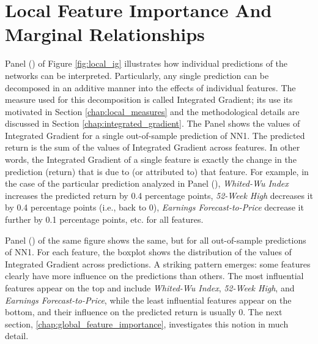 \section {Local Feature Importance And Marginal Relationships}
	\label{chap:local_feature_importance}

	Panel () of Figure \ref{fig:local_ig} illustrates how individual predictions of the networks can be interpreted. Particularly, any single prediction can be decomposed in an additive manner into the effects of individual features. The measure used for this decomposition is called Integrated Gradient; its use its motivated in Section \ref{chap:local_measures} and the methodological details are discussed in Section \ref{chap:integrated_gradient}. The Panel shows the values of Integrated Gradient for a single out-of-sample prediction of NN1. The predicted return is the sum of the values of Integrated Gradient across features. In other words, the Integrated Gradient of a single feature is exactly the change in the prediction (return) that is due to (or attributed to) that feature. For example, in the case of the particular prediction analyzed in Panel (),\textit{ Whited-Wu Index} increases the predicted return by 0.4 percentage points, \textit{52-Week High} decreases it by 0.4 percentage points (i.e., back to 0), \textit{Earnings Forecast-to-Price} decrease it further by 0.1 percentage points, etc. for all features. 
	
	Panel () of the same figure shows the same, but for all out-of-sample predictions of NN1. For each feature, the boxplot shows the distribution of the values of Integrated Gradient across predictions. 
	A striking pattern emerges: some features clearly have more influence on the predictions than others. The most influential features appear on the top and include \textit{Whited-Wu Index}, \textit{52-Week High}, and \textit{Earnings Forecast-to-Price}, while the least influential features appear on the bottom, and their influence on the predicted return is usually 0. The next section, \ref{chap:global_feature_importance}, investigates this notion in much detail. 
	

